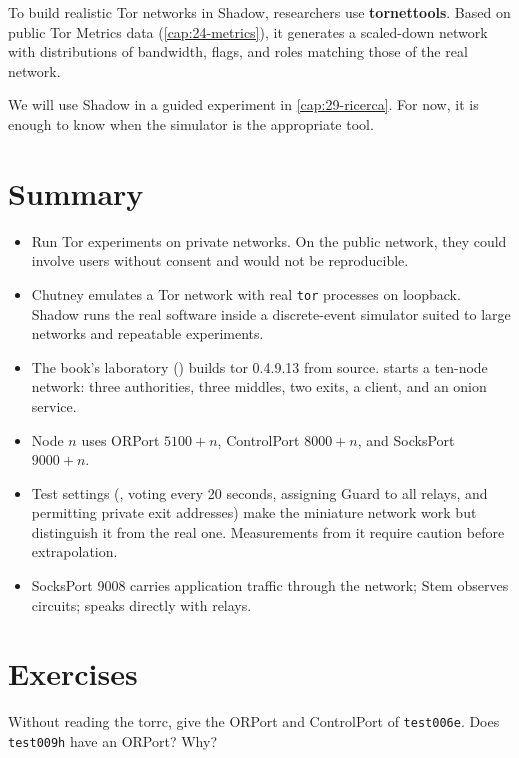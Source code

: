 To build realistic Tor networks in Shadow, researchers use \textbf{tornettools}. Based on public Tor Metrics data (\cref{cap:24-metrics}), it generates a scaled-down network with distributions of bandwidth, flags, and roles matching those of the real network.

We will use Shadow in a guided experiment in \cref{cap:29-ricerca}. For now, it is enough to know when the simulator is the appropriate tool.

\section*{Summary}
\begin{itemize}
  \item Run Tor experiments on private networks. On the public network, they could involve users without consent and would not be reproducible.
  \item Chutney emulates a Tor network with real \texttt{tor} processes on loopback. Shadow runs the real software inside a discrete-event simulator suited to large networks and repeatable experiments.
  \item The book's laboratory () builds tor 0.4.9.13 from source.  starts a ten-node network: three authorities, three middles, two exits, a client, and an onion service.
  \item Node $n$ uses ORPort $5100+n$, ControlPort $8000+n$, and SocksPort $9000+n$.
  \item Test settings (, voting every 20 seconds, assigning Guard to all relays, and permitting private exit addresses) make the miniature network work but distinguish it from the real one. Measurements from it require caution before extrapolation.
  \item SocksPort 9008 carries application traffic through the network; Stem observes circuits;  speaks directly with relays.
\end{itemize}

\section*{Exercises}

\begin{esercizio}[1]\label{es:19-porte}
Without reading the torrc, give the ORPort and ControlPort of \texttt{test006e}. Does \texttt{test009h} have an ORPort? Why?
\end{esercizio}

